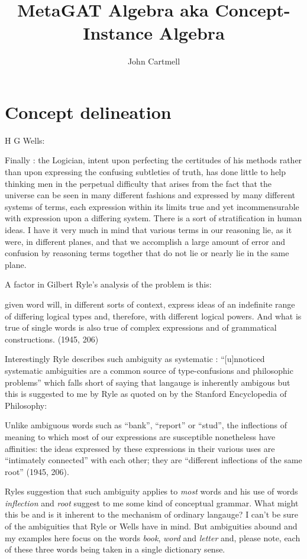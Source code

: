\documentclass[10pt,a4paper]{article}
\title{MetaGAT Algebra aka Concept-Instance Algebra}
\author{John Cartmell}
\begin{document}
\maketitle

\section{Concept delineation}
\mynote 
H G Wells:
\begin{tightquote}
Finally : the Logician, intent upon perfecting the certitudes of his methods rather than upon expressing the confusing subtleties of truth, has done little to help thinking men in the perpetual difficulty that arises from the fact that the universe can be seen in many different fashions and expressed by many different systems of terms, each expression within its limits true and yet incommensurable with expression upon a differing system. There is a sort of stratification in human ideas. I have it very much in mind that various terms in our reasoning lie, as it were, in different planes, and that we accomplish a large amount of error and confusion by reasoning terms together that do not lie or nearly lie in the same plane.
\end{tightquote}
\mynote
A factor in Gilbert Ryle's analysis of the problem is this:
\begin{tightquote}
[a] given word will, in different sorts of context, express ideas of an indefinite range of differing logical types and, therefore, with different logical powers. And what is true of single words is also true of complex expressions and of grammatical constructions. (1945, 206)
\end{tightquote}
Interestingly Ryle describes such ambiguity as systematic : “[u]nnoticed systematic ambiguities are a common source of type-confusions and philosophic problems” which falls short of saying that langauge is inherently ambigous but this is suggested to me by Ryle as quoted on
by the Stanford Encyclopedia of Philosophy:
\begin{tightquote}
Unlike ambiguous words such as “bank”, “report” or “stud”, the inflections of meaning to which most of our expressions are susceptible nonetheless have affinities: the ideas expressed by these expressions in their various uses are “intimately connected” with each other; they are “different inflections of the same root” (1945, 206).
\end{tightquote}
Ryles suggestion that such ambiguity applies to \textit{most} words and his use of words \textit{inflection} and \textit{root} suggest to me some kind of conceptual grammar. What might this be and is it inherent to the mechanism  of ordinary langauge? 
\mynote 
I can't be sure of the ambiguities that Ryle or Wells have in mind. But ambiguities abound and my examples here focus on the words \textit{book},
\textit{word} and \textit{letter} and, please note, each of these three words being taken in a single dictionary sense.
\end{document}
